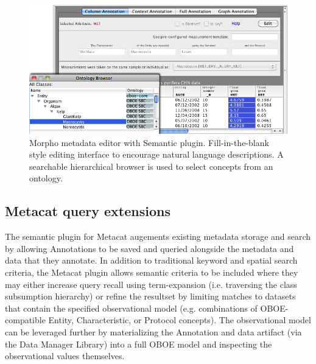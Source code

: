 \begin{figure}
\centering
\includegraphics[width=1.0\textwidth]{images/morpho-annotation-widget.png}
\caption{Morpho metadata editor with Semantic plugin. Fill-in-the-blank style editing interface to encourage natural language descriptions. A searchable hierarchical browser is used to select concepts from an ontology.}
\label{fig:morpho-annotation}
\end{figure}

\subsection{Metacat query extensions}
The semantic plugin for Metacat augements existing metadata storage and search by allowing Annotations to be saved and queried alongside the metadata and data that they annotate. In addition to traditional keyword and spatial search criteria, the Metacat plugin allows semantic criteria to be included where they may either increase query recall using term-expansion (i.e. traversing the class subsumption hierarchy) or refine the resultset by limiting matches to datasets that contain the specified observational model (e.g. combinations of OBOE-compatible Entity, Characteristic, or Protocol concepts). The observational model can be leveraged further by materializing the Annotation and data artifact (via the Data Manager Library) into a full OBOE model and inspecting the observational values themselves. 

